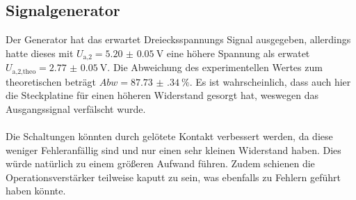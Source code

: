 \subsection{Signalgenerator}
Der Generator hat das erwartet Dreiecksspannungs Signal ausgegeben, allerdings hatte dieses mit $U_\text{a,2} = \SI{5.20(5)}{\V}$ eine höhere Spannung als erwatet $U_\text{a,2,theo} = \SI{2.77(5)}{\V}$.
Die Abweichung des experimentellen Wertes zum theoretischen beträgt $Abw = \SI{87.73(34)}{}\%$.
Es ist wahrscheinlich, dass auch hier die Steckplatine für einen höheren Widerstand gesorgt hat, weswegen das Ausgangssignal verfälscht wurde.
\\\\
Die Schaltungen könnten durch gelötete Kontakt verbessert werden, da diese weniger Fehleranfällig sind und nur einen sehr kleinen Widerstand haben.
Dies würde natürlich zu einem größeren Aufwand führen.
Zudem schienen die Operationsverstärker teilweise kaputt zu sein, was ebenfalls zu Fehlern geführt haben könnte.
